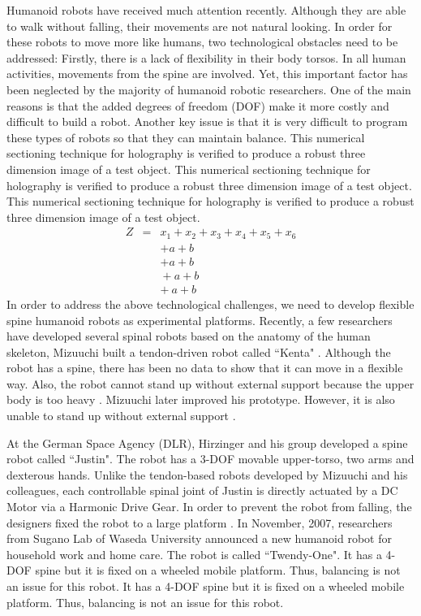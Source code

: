 \documentclass[]{IEEEphot}
\begin{document}
Humanoid robots have received much attention recently. Although they are able to walk without falling, their movements are not natural looking. In order for these robots to move more like humans, two technological obstacles need to be addressed: Firstly, there is a lack of flexibility in their body torsos. In all human activities, movements from the spine are involved. Yet, this important factor has been neglected by the majority of humanoid robotic researchers. One of the main reasons is that the added degrees of freedom (DOF) make it more costly and difficult to build a robot. Another key issue is that it is very difficult to program these types of robots so that they can maintain 
balance. This numerical sectioning technique for holography is verified to produce a robust three dimension image of a test object. This numerical sectioning technique for holography is verified to produce a robust three dimension image of a test object.  This numerical sectioning technique for holography is verified to produce a robust three dimension image of a test object.   
\setlength{\arraycolsep}{0.0em}
\begin{eqnarray}
Z&{}={}&x_1 + x_2 + x_3 + x_4 + x_5 + x_6 \nonumber\\
&&+a + b\\
&&+{}a + b\\
&&{}+a + b\\
&&{+}\:a + b
\end{eqnarray}
\setlength{\arraycolsep}{5pt}
In order to address the above technological challenges, we need to develop flexible spine humanoid robots as experimental platforms. Recently, a few researchers have developed several spinal robots based on the anatomy of the human skeleton, Mizuuchi built a tendon-driven robot called {``}Kenta{"} \cite{Mizuuchi2002, Mizuuchi2003}. Although the robot has a spine, there has been no data to show that it can move in a flexible way. Also, the robot cannot stand up without external support because the upper body is too heavy \cite{Mizuuchi2003}. Mizuuchi later improved his prototype. However, it is also unable to 
stand up without external support \cite{Mizuuchi2005,Nakanishi2007}.
 
At the German Space Agency (DLR), Hirzinger and his group developed a spine robot called {``}Justin{"}. The robot has a 3-DOF movable upper-torso, two arms and dexterous hands. Unlike the tendon-based robots developed by Mizuuchi and his colleagues, each controllable spinal joint of Justin is directly actuated by a DC Motor via a Harmonic Drive Gear. In order to prevent the robot from falling, the designers fixed the robot to a large platform \cite{Ott2006}. In November, 2007, researchers from Sugano Lab of Waseda University announced a new humanoid robot for household work and home care. The robot is called {``}Twendy-One{"}. It has a 4-DOF spine but it is fixed on a wheeled mobile platform. Thus, balancing is not an issue for this robot. It has a 4-DOF spine but it is fixed on a wheeled mobile platform. Thus, balancing is not an issue for this robot.
 
\end{document}
